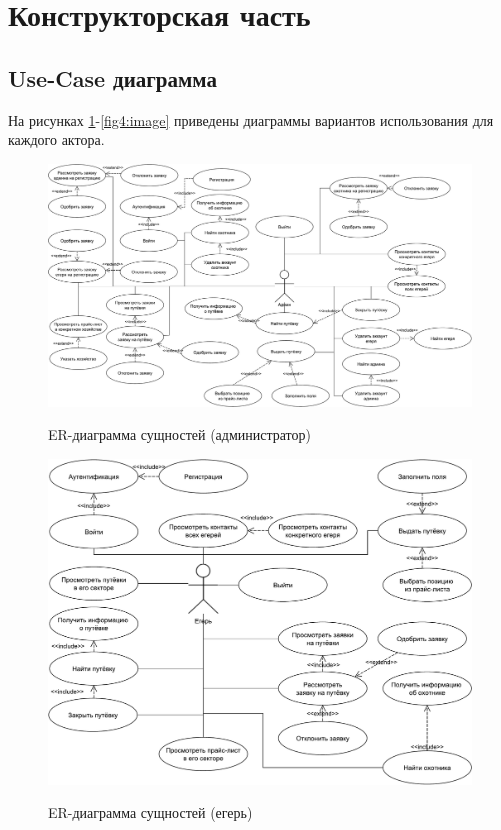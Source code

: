 \section{Конструкторская часть}	
	\subsection{Use-Case диаграмма}
	На рисунках \ref{fig2:image}-\ref{fig4:image} приведены диаграммы вариантов использования для каждого актора.
	
	\begin{figure}[ph!]
		\centering
		\begin{center}
			{\includegraphics[scale=0.44, angle=90]{schemes/use-case_admin.pdf}}
			\caption{ER-диаграмма сущностей (администратор)}
			\label{fig2:image}
		\end{center}
	\end{figure}

	\begin{figure}[ph!]
		\centering
		\begin{center}
			{\includegraphics[scale=0.45]{schemes/use-case_huntsman.pdf}}
			\caption{ER-диаграмма сущностей (егерь)}
			\label{fig3:image}
		\end{center}
	\end{figure}

